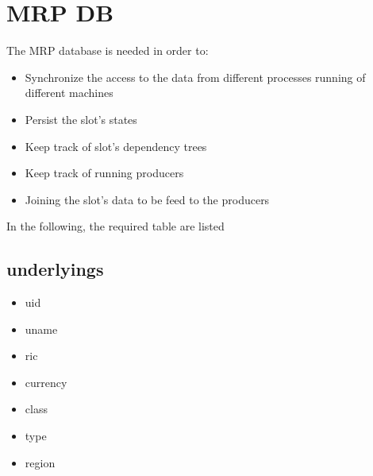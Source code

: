 \documentclass[letterpaper,10pt,english]{sphinxmanual}
\begin{document}
\chapter{MRP DB}
\label{\detokenize{mrb:mrp-db}}\label{\detokenize{mrb::doc}}
The MRP database is needed in order to:
\begin{itemize}
\item {} 
Synchronize the access to the data from different processes running of different machines

\item {} 
Persist the slot’s states

\item {} 
Keep track of slot’s dependency trees

\item {} 
Keep track of running producers

\item {} 
Joining the slot’s data to be feed to the producers

\end{itemize}

In the following, the required table are listed


\section{underlyings}
\label{\detokenize{mrb:underlyings}}\begin{itemize}
\item {} 
uid

\item {} 
uname

\item {} 
ric

\item {} 
currency

\item {} 
class

\item {} 
type

\item {} 
region

\end{itemize}
\end{document}
